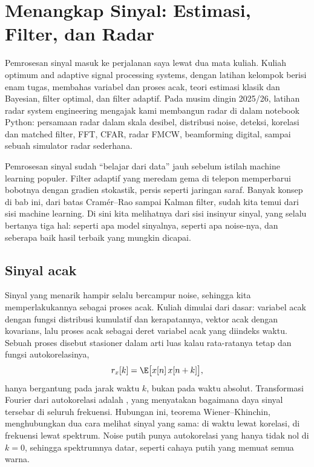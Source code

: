 \chapter{Menangkap Sinyal: Estimasi, Filter, dan Radar}
\label{ch:sinyal}

Pemrosesan sinyal masuk ke perjalanan saya lewat dua mata kuliah. Kuliah optimum and adaptive signal
processing systems, dengan latihan kelompok berisi enam tugas, membahas variabel dan proses acak,
teori estimasi klasik dan Bayesian, filter optimal, dan filter adaptif. Pada musim dingin 2025/26,
latihan radar system engineering mengajak kami membangun radar di dalam notebook Python: persamaan
radar dalam skala desibel, distribusi noise, deteksi, korelasi dan matched filter, FFT, CFAR, radar
FMCW, beamforming digital, sampai sebuah simulator radar sederhana.

Pemrosesan sinyal sudah ``belajar dari data'' jauh sebelum istilah machine learning populer. Filter
adaptif yang meredam gema di telepon memperbarui bobotnya dengan gradien stokastik, persis seperti
jaringan saraf. Banyak konsep di bab ini, dari batas Cramér--Rao sampai Kalman filter, sudah kita temui
dari sisi machine learning. Di sini kita melihatnya dari sisi insinyur sinyal, yang selalu bertanya
tiga hal: seperti apa model sinyalnya, seperti apa noise-nya, dan seberapa baik hasil terbaik yang
mungkin dicapai.

\section{Sinyal acak}

Sinyal yang menarik hampir selalu bercampur noise, sehingga kita memperlakukannya sebagai proses acak.
Kuliah dimulai dari dasar: variabel acak dengan fungsi distribusi kumulatif dan kerapatannya, vektor
acak dengan kovarians, lalu proses acak sebagai deret variabel acak yang diindeks waktu. Sebuah proses
disebut stasioner dalam arti luas kalau rata-ratanya tetap dan fungsi autokorelasinya,
\begin{equation}
r_x[k]=\E\big[x[n]\,x[n+k]\big],
\end{equation}
hanya bergantung pada jarak waktu $k$, bukan pada waktu absolut. Transformasi Fourier dari
autokorelasi adalah , yang menyatakan bagaimana daya sinyal tersebar di
seluruh frekuensi. Hubungan ini, teorema Wiener--Khinchin, menghubungkan dua cara melihat sinyal yang
sama: di waktu lewat korelasi, di frekuensi lewat spektrum. Noise putih punya autokorelasi yang hanya
tidak nol di $k=0$, sehingga spektrumnya datar, seperti cahaya putih yang memuat semua warna.

